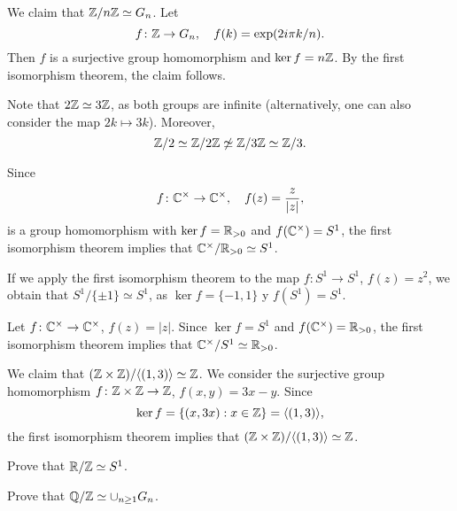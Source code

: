 \begin{example}
We claim that $\mathbb{Z}/n\mathbb{Z}\simeq G_n$. Let 
\[
f\colon\mathbb{Z}\to G_n,\quad
f(k)=\exp(2i\pi k/n).
\]
Then $f$ is a surjective group homomorphism and
$\ker f=n\mathbb{Z}$. By the first isomorphism theorem, the claim follows. 
\end{example}

\begin{example}
Note that $2\mathbb{Z}\simeq 3\mathbb{Z}$, as both groups are infinite (alternatively, one can also consider the map $2k\mapsto 3k$). Moreover, 
\[
\mathbb{Z}/2\simeq\mathbb{Z}/2\mathbb{Z}\not\simeq\mathbb{Z}/3\mathbb{Z}\simeq\mathbb{Z}/3.
\]
\end{example}

\begin{example}
Since 
\[
f\colon\mathbb{C}^\times\to\mathbb{C}^\times,
\quad
f(z)=\frac{z}{|z|},
\]
is a group homomorphism with $\ker f=\mathbb{R}_{>0}$ and
$f(\mathbb{C}^\times)=S^1$, the first isomorphism theorem 
implies that 
$\mathbb{C}^\times/\mathbb{R}_{>0}\simeq S^1$.
\end{example}

\begin{example}
If we apply the first isomorphism theorem to the
map $f\colon S^1\to S^1$, $f(z)=z^2$, we obtain that 
$S^1/\{\pm1\}\simeq S^1$, as 
$\ker f=\{-1,1\}$ y $f(S^1)=S^1$.
\end{example}

\begin{example}
Let $f\colon\mathbb{C}^\times\to\mathbb{C}^\times$, $f(z)=|z|$. Since $\ker f=S^1$ and $f(\mathbb{C}^\times)=\mathbb{R}_{>0}$, the first isomorphism theorem 
implies that $\mathbb{C}^\times/S^1\simeq\mathbb{R}_{>0}$.
\end{example}

\begin{example}
We claim that 
$(\mathbb{Z}\times\mathbb{Z})/\langle (1,3)\rangle\simeq\mathbb{Z}$. We consider
the surjective group homomorphism 
$f\colon\mathbb{Z}\times\mathbb{Z}\to\mathbb{Z}$, $f(x,y)=3x-y$. Since 
\[
\ker f=\{(x,3x):x\in\mathbb{Z}\}=\langle (1,3)\rangle,
\]
the first isomorphism theorem implies that 
$(\mathbb{Z}\times\mathbb{Z})/\langle (1,3)\rangle\simeq\mathbb{Z}$.
\end{example}

\begin{exercise}
Prove that $\mathbb{R}/\mathbb{Z}\simeq S^1$.
\end{exercise}



\begin{exercise}
Prove that $\mathbb{Q}/\mathbb{Z}\simeq\cup_{n\geq1}G_n$.
\end{exercise}

